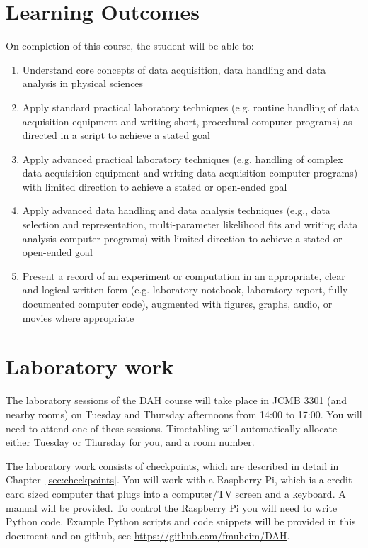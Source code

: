 \section{Learning Outcomes}

On completion of this course, the student will be able to:
\begin{enumerate}
\item Understand core concepts of data acquisition, data handling and data analysis in physical sciences
\item Apply standard practical laboratory techniques (e.g. routine handling of data acquisition equipment and writing short, procedural computer programs) as directed in a script to achieve a stated goal
\item Apply advanced practical laboratory techniques (e.g. handling of complex data acquisition equipment and writing data acquisition computer programs) with limited direction to achieve a stated or open-ended goal
\item Apply advanced data handling and data analysis techniques (e.g., data selection and representation, multi-parameter likelihood fits and writing data analysis computer programs) with limited direction to achieve a stated or open-ended goal
\item Present a record of an experiment or computation in an appropriate, clear and logical written form (e.g. laboratory notebook, laboratory report, fully documented computer code), augmented with figures, graphs, audio, or movies where appropriate
\end{enumerate}

\newpage
\section{Laboratory work}

The laboratory sessions of the DAH course will take place in JCMB 3301 (and nearby rooms) on Tuesday and Thursday afternoons from 14:00 to 17:00.%
You will need to attend one of these sessions.
Timetabling will automatically allocate either Tuesday or Thursday for you, and a room number.

The laboratory work consists of checkpoints, which are described in detail in Chapter~\ref{sec:checkpoints}.
You will work with a Raspberry Pi, which is a credit-card sized computer that plugs into a computer/TV screen and a keyboard.
A manual will be provided.
To control the Raspberry Pi you will need to write Python code.
Example Python scripts and code snippets will be provided in this document and on github, see \url{https://github.com/fmuheim/DAH}. 

